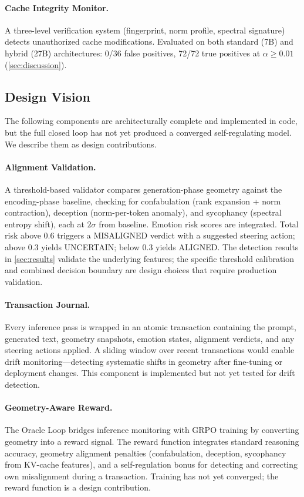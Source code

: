 \paragraph{Cache Integrity Monitor.}
A three-level verification system (fingerprint, norm profile, spectral
signature) detects unauthorized cache modifications. Evaluated on both
standard (7B) and hybrid (27B) architectures: 0/36 false positives,
72/72 true positives at $\alpha \geq 0.01$ (\cref{sec:discussion}).

\subsection{Design Vision}

The following components are architecturally complete and implemented in
code, but the full closed loop has not yet produced a converged
self-regulating model. We describe them as design contributions.

\paragraph{Alignment Validation.}
A threshold-based validator compares generation-phase geometry against
the encoding-phase baseline, checking for confabulation (rank expansion
+ norm contraction), deception (norm-per-token anomaly), and sycophancy
(spectral entropy shift), each at $2\sigma$ from baseline. Emotion risk
scores are integrated. Total risk above 0.6 triggers a MISALIGNED
verdict with a suggested steering action; above 0.3 yields UNCERTAIN;
below 0.3 yields ALIGNED. The detection results in \cref{sec:results}
validate the underlying features; the specific threshold calibration and
combined decision boundary are design choices that require production
validation.

\paragraph{Transaction Journal.}
Every inference pass is wrapped in an atomic transaction containing the
prompt, generated text, geometry snapshots, emotion states, alignment
verdicts, and any steering actions applied. A sliding window over recent
transactions would enable drift monitoring---detecting systematic shifts
in geometry after fine-tuning or deployment changes. This component is
implemented but not yet tested for drift detection.

\paragraph{Geometry-Aware Reward.}
The Oracle Loop bridges inference monitoring with GRPO training by
converting geometry into a reward signal. The reward function integrates
standard reasoning accuracy, geometry alignment penalties (confabulation,
deception, sycophancy from KV-cache features), and a self-regulation
bonus for detecting and correcting own misalignment during a transaction.
Training has not yet converged; the reward function is a design
contribution.

